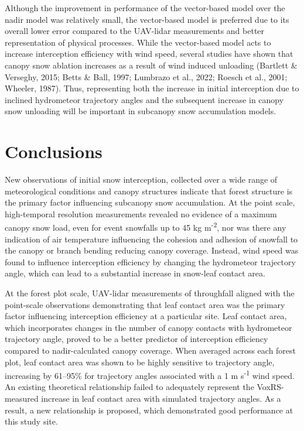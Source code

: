 \documentclass[
  letterpaper,
  DIV=11,
  numbers=noendperiod]{scrartcl}
\begin{document}
Although the improvement in performance of the vector-based model over
the nadir model was relatively small, the vector-based model is
preferred due to its overall lower error compared to the UAV-lidar
measurements and better representation of physical processes. While the
vector-based model acts to increase interception efficiency with wind
speed, several studies have shown that canopy snow ablation increases as
a result of wind induced unloading (Bartlett \& Verseghy, 2015; Betts \&
Ball, 1997; Lumbrazo et al., 2022; Roesch et al., 2001; Wheeler, 1987).
Thus, representing both the increase in initial interception due to
inclined hydrometeor trajectory angles and the subsequent increase in
canopy snow unloading will be important in subcanopy snow accumulation
models.

\section{Conclusions}\label{conclusions}

New observations of initial snow interception, collected over a wide
range of meteorological conditions and canopy structures indicate that
forest structure is the primary factor influencing subcanopy snow
accumulation. At the point scale, high-temporal resolution measurements
revealed no evidence of a maximum canopy snow load, even for event
snowfalls up to 45 kg m\textsuperscript{-2}, nor was there any
indication of air temperature influencing the cohesion and adhesion of
snowfall to the canopy or branch bending reducing canopy coverage.
Instead, wind speed was found to influence interception efficiency by
changing the hydrometeor trajectory angle, which can lead to a
substantial increase in snow-leaf contact area.

At the forest plot scale, UAV-lidar measurements of throughfall aligned
with the point-scale observations demonstrating that leaf contact area
was the primary factor influencing interception efficiency at a
particular site. Leaf contact area, which incorporates changes in the
number of canopy contacts with hydrometeor trajectory angle, proved to
be a better predictor of interception efficiency compared to
nadir-calculated canopy coverage. When averaged across each forest plot,
leaf contact area was shown to be highly sensitive to trajectory angle,
increasing by 61--95\% for trajectory angles associated with a 1 m
s\textsuperscript{-1} wind speed. An existing theoretical relationship
failed to adequately represent the VoxRS-measured increase in leaf
contact area with simulated trajectory angles. As a result, a new
relationship is proposed, which demonstrated good performance at this
study site.
\end{document}
